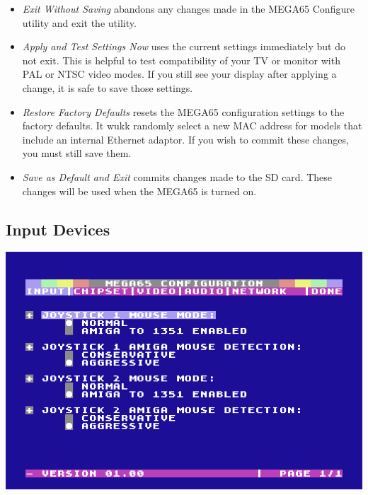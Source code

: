 \begin{itemize}
  \item{\em Exit Without Saving} abandons any changes made in the MEGA65 Configure utility and exit the utility.
  \item{\em Apply and Test Settings Now} uses the current settings immediately but do not exit. This is helpful to test compatibility of your TV or monitor with PAL or NTSC video modes. If you still see your display after applying a change, it is safe to save those settings.
  \item{\em Restore Factory Defaults} resets the MEGA65 configuration settings to the factory defaults. It wukk randomly select a new MAC address for models that include an internal Ethernet adaptor. If you wish to commit these changes, you must still save them.
  \item{\em Save as Default and Exit} commits changes made to the SD card. These changes will be used when the MEGA65 is turned on.
\end{itemize}

\subsection{Input Devices}

\includegraphics[width=\linewidth]{images/ss-m65config-1.png}

